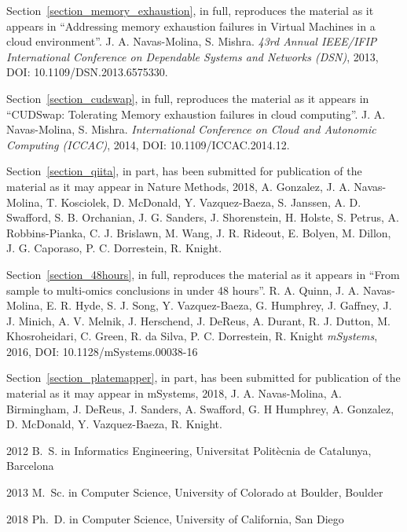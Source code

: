 \begin{frontmatter}
\begin{acknowledgements}
    Section~\ref{section_memory_exhaustion}, in full, reproduces the material as it
    appears in ``Addressing memory exhaustion failures in Virtual Machines in a cloud environment''.
    J. A. Navas-Molina, S. Mishra. \emph{43rd Annual IEEE/IFIP International Conference on Dependable Systems and Networks (DSN)},
    2013, DOI: 10.1109/DSN.2013.6575330.

    Section~\ref{section_cudswap}, in full, reproduces the material as it
    appears in ``CUDSwap: Tolerating Memory exhaustion failures in cloud computing''.
    J. A. Navas-Molina, S. Mishra. \emph{International Conference on Cloud and Autonomic Computing (ICCAC)},
    2014, DOI: 10.1109/ICCAC.2014.12.

    Section~\ref{section_qiita}, in part, has been submitted for publication of the
    material as it may appear in Nature Methods, 2018, A. Gonzalez, J. A. Navas-Molina,
    T. Kosciolek, D. McDonald, Y. Vazquez-Baeza, S. Janssen, A. D. Swafford, S. B. Orchanian,
    J. G. Sanders, J. Shorenstein, H. Holste, S. Petrus, A. Robbins-Pianka, C. J. Brislawn,
    M. Wang, J. R. Rideout, E. Bolyen, M. Dillon, J. G. Caporaso, P. C. Dorrestein, R. Knight.

    Section~\ref{section_48hours}, in full, reproduces the material as it
    appears in ``From sample to multi-omics conclusions in under 48 hours''.
    R. A. Quinn, J. A. Navas-Molina, E. R. Hyde, S. J. Song, Y. Vazquez-Baeza,
    G. Humphrey, J. Gaffney, J. J. Minich, A. V. Melnik, J. Herschend, J. DeReus,
    A. Durant, R. J. Dutton, M. Khosroheidari, C. Green, R. da Silva, P. C. Dorrestein,
    R. Knight \emph{mSystems}, 2016, DOI: 10.1128/mSystems.00038-16

    Section~\ref{section_platemapper}, in part, has been submitted for publication of the
    material as it may appear in mSystems, 2018, J. A. Navas-Molina, A. Birmingham,
    J. DeReus, J. Sanders, A. Swafford, G. H Humphrey, A. Gonzalez, D. McDonald,
    Y. Vazquez-Baeza, R. Knight.

\end{acknowledgements}


%
%
\begin{vitapage}
\begin{vita}
  \item[2012] B.~S. in Informatics Engineering, Universitat Polit\`ecnia de Catalunya, Barcelona
  \item[2013] M.~Sc. in Computer Science, University of Colorado at Boulder, Boulder
  \item[2018] Ph.~D. in Computer Science, University of California, San Diego
\end{vita}



\end{vitapage}
\end{frontmatter}

